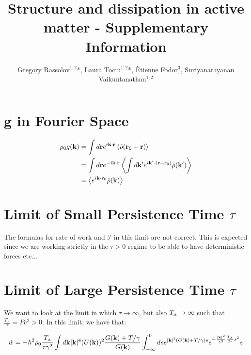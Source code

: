 \documentclass[amsmath,preprintnumbers,10pt,article,notitlepage]{revtex4-1}
\newcommand{\A}{\text{\tiny{A}}}
\begin{document}
 
\title{Structure and dissipation in active matter - Supplementary Information}
\author{Gregory Rassolov$^{1,2}$*, Laura Tociu$^{1,2}$*, \`Etienne Fodor$^{3}$, Suriyanarayanan Vaikuntanathan$^{1,2}$}

\maketitle

\section{g in Fourier Space}

\begin{align*}
\rho_0 g({\bf k}) & = \int d{\bf r} e^{i{\bf k} \cdot{\bf r}} \left \langle   \bar \rho( {\bf r}_0 + {\bf r} ) \right \rangle \\ 
& =  \int d{\bf r} e^{-i{\bf k} \cdot{\bf r}} \left \langle   \int d{\bf k}' e^{i{\bf k}' \cdot( {\bf r} +  {\bf r}_0) } \bar{\rho}({\bf k}') \right \rangle \\ 
& =  \left \langle  e^{i{\bf k} \cdot {\bf r}_0 } \bar{\rho}({\bf k}) \right \rangle
\end{align*}

\section{Limit of Small Persistence Time $\tau$}

The formulas for rate of work and $\mathcal{I}$ in this limit are not correct. This is expected since we are working strictly in the $\tau > 0$ regime to be able to have deterministic forces etc...

\section{Limit of Large Persistence Time $\tau$}\label{sec:large_tau}

We want to look at the limit in which $\tau \to \infty$, but also $T_\A \to \infty$  such that $\frac{T_A}{\tau} = Pe^2 > 0$. In this limit, we have that:


\begin{equation}\label{eq:final_expression_work_large_tau}
\dot{w}  = -h^2 \rho_0 \dfrac{T_\A}{\tau \gamma^2} \int d{\bf k} |{\bf k}|^4 (U({\bf k}))^2 \dfrac{ G({\bf k}) + T/ \gamma}{G({\bf k})} 
\int_{-\infty}^0 ds e^{|{\bf k}|^2 ( G({\bf k}) + T/ \gamma)s} e^{-\frac{|{\bf k}|^2}{\gamma^2}\frac{T_\A}{2\tau}{s}^2} s 
\end{equation}
\end{document}
